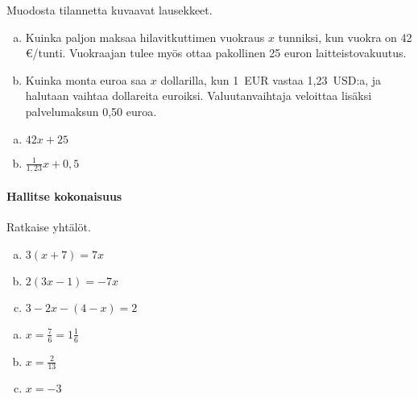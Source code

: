 \begin{tehtavasivu}
\begin{tehtava}
    Muodosta tilannetta kuvaavat lausekkeet.
    \begin{enumerate}[(a)]
        \item Kuinka paljon maksaa hilavitkuttimen vuokraus $x$ tunniksi, kun vuokra on 42 \euro /tunti. 
        	Vuokraajan tulee myös ottaa pakollinen 25 euron laitteistovakuutus.
        \item Kuinka monta euroa saa $x$ dollarilla, kun 1~EUR vastaa 1,23~USD:a,
        	ja halutaan vaihtaa dollareita euroiksi. Valuutanvaihtaja veloittaa lisäksi palvelumaksun 0,50 euroa.
    \end{enumerate}
    \begin{vastaus}
        \begin{enumerate}[(a)]
            \item $42x + 25$
            \item $\frac{1}{1{,}23}x + 0{,}5$
        \end{enumerate}
    \end{vastaus}
\end{tehtava}



\paragraph*{Hallitse kokonaisuus}

\begin{tehtava}
    Ratkaise yhtälöt.
    \begin{enumerate}[(a)]
        \item $3(x+7)=7x$
        \item $2(3x-1)=-7x $
        \item $3-2x-(4-x)=2 $
    \end{enumerate}
    \begin{vastaus}
        \begin{enumerate}[(a)]
            \item $x = \frac{7}{6} =1\frac{1}{6} $
            \item $x = \frac{2}{13}$
            \item $x = -3$
        \end{enumerate}
    \end{vastaus}
\end{tehtava}


\end{tehtavasivu}
